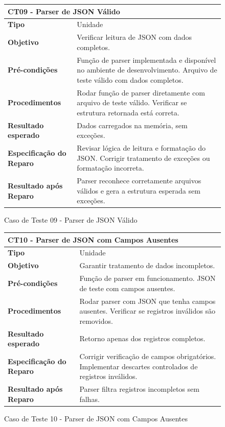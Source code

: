 \begin{figure}[H]
    \centering
\begin{longtable}{|p{}|p{}|}
\hline
\multicolumn{2}{|l|}{\textbf{CT09 - Parser de JSON Válido}} \\
\hline
\textbf{Tipo} & Unidade \\
\hline
\textbf{Objetivo} & Verificar leitura de JSON com dados completos. \\
\hline
\textbf{Pré-condições} & Função de parser implementada e disponível no ambiente de desenvolvimento.  Arquivo de teste válido com dados completos. \\
\hline
\textbf{Procedimentos} & Rodar função de parser diretamente com arquivo de teste válido.  Verificar se estrutura retornada está correta. \\
\hline
\textbf{Resultado esperado} & Dados carregados na memória, sem exceções. \\
\hline
\textbf{Especificação do Reparo} & Revisar lógica de leitura e formatação do JSON.  Corrigir tratamento de exceções ou formatação incorreta. \\
\hline
\textbf{Resultado após Reparo} & Parser reconhece corretamente arquivos válidos e gera a estrutura esperada sem exceções. \\
\hline
\end{longtable}
\caption{Caso de Teste 09 - Parser de JSON Válido}
\label{fig_ct09_parser_json_valido}
\end{figure}

\begin{figure}[H]
    \centering
\begin{longtable}{|p{}|p{}|}
\hline
\multicolumn{2}{|l|}{\textbf{CT10 - Parser de JSON com Campos Ausentes}} \\
\hline
\textbf{Tipo} & Unidade \\
\hline
\textbf{Objetivo} & Garantir tratamento de dados incompletos. \\
\hline
\textbf{Pré-condições} & Função de parser em funcionamento.  JSON de teste com campos ausentes. \\
\hline
\textbf{Procedimentos} &  Rodar parser com JSON que tenha campos ausentes.  Verificar se registros inválidos são removidos. \\
\hline
\textbf{Resultado esperado} & Retorno apenas dos registros completos. \\
\hline
\textbf{Especificação do Reparo} & Corrigir verificação de campos obrigatórios.  Implementar descartes controlados de registros inválidos. \\
\hline
\textbf{Resultado após Reparo} & Parser filtra registros incompletos sem falhas. \\
\hline
\end{longtable}
\caption{Caso de Teste 10 - Parser de JSON com Campos Ausentes}
\label{fig_ct10_parser_json_campos_ausentes}
\end{figure}

